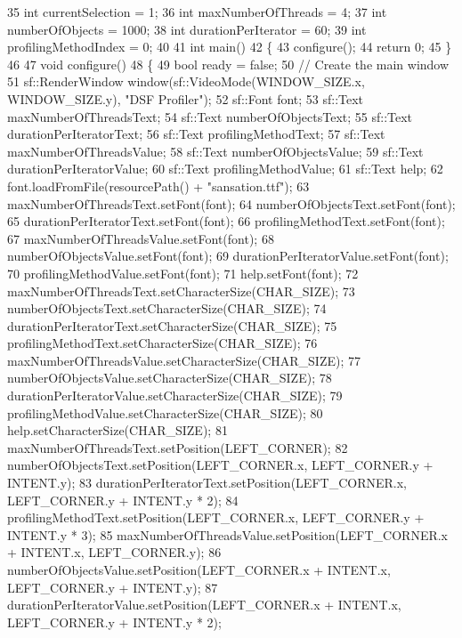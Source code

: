 \begin{DoxyCodeInclude}
35 \textcolor{keywordtype}{int} currentSelection = 1;
36 \textcolor{keywordtype}{int} maxNumberOfThreads = 4;
37 \textcolor{keywordtype}{int} numberOfObjects = 1000;
38 \textcolor{keywordtype}{int} durationPerIterator = 60;
39 \textcolor{keywordtype}{int} profilingMethodIndex = 0;
40 
41 \textcolor{keywordtype}{int} main()
42 \{
43     configure();
44     \textcolor{keywordflow}{return} 0;
45 \}
46 
47 \textcolor{keywordtype}{void} configure()
48 \{
49     \textcolor{keywordtype}{bool} ready = \textcolor{keyword}{false};
50     \textcolor{comment}{// Create the main window}
51     sf::RenderWindow window(sf::VideoMode(WINDOW\_SIZE.x, WINDOW\_SIZE.y), \textcolor{stringliteral}{"DSF Profiler"});
52     sf::Font font;
53     sf::Text maxNumberOfThreadsText;
54     sf::Text numberOfObjectsText;
55     sf::Text durationPerIteratorText;
56     sf::Text profilingMethodText;
57     sf::Text maxNumberOfThreadsValue;
58     sf::Text numberOfObjectsValue;
59     sf::Text durationPerIteratorValue;
60     sf::Text profilingMethodValue;
61     sf::Text help;
62     font.loadFromFile(resourcePath() + \textcolor{stringliteral}{"sansation.ttf"});
63     maxNumberOfThreadsText.setFont(font);
64     numberOfObjectsText.setFont(font);
65     durationPerIteratorText.setFont(font);
66     profilingMethodText.setFont(font);
67     maxNumberOfThreadsValue.setFont(font);
68     numberOfObjectsValue.setFont(font);
69     durationPerIteratorValue.setFont(font);
70     profilingMethodValue.setFont(font);
71     help.setFont(font);
72     maxNumberOfThreadsText.setCharacterSize(CHAR\_SIZE);
73     numberOfObjectsText.setCharacterSize(CHAR\_SIZE);
74     durationPerIteratorText.setCharacterSize(CHAR\_SIZE);
75     profilingMethodText.setCharacterSize(CHAR\_SIZE);
76     maxNumberOfThreadsValue.setCharacterSize(CHAR\_SIZE);
77     numberOfObjectsValue.setCharacterSize(CHAR\_SIZE);
78     durationPerIteratorValue.setCharacterSize(CHAR\_SIZE);
79     profilingMethodValue.setCharacterSize(CHAR\_SIZE);
80     help.setCharacterSize(CHAR\_SIZE);
81     maxNumberOfThreadsText.setPosition(LEFT\_CORNER);
82     numberOfObjectsText.setPosition(LEFT\_CORNER.x, LEFT\_CORNER.y + INTENT.y);
83     durationPerIteratorText.setPosition(LEFT\_CORNER.x, LEFT\_CORNER.y + INTENT.y * 2);
84     profilingMethodText.setPosition(LEFT\_CORNER.x, LEFT\_CORNER.y + INTENT.y * 3);
85     maxNumberOfThreadsValue.setPosition(LEFT\_CORNER.x + INTENT.x, LEFT\_CORNER.y);
86     numberOfObjectsValue.setPosition(LEFT\_CORNER.x + INTENT.x, LEFT\_CORNER.y + INTENT.y);
87     durationPerIteratorValue.setPosition(LEFT\_CORNER.x + INTENT.x, LEFT\_CORNER.y + INTENT.y * 2);

\end{DoxyCodeInclude}
